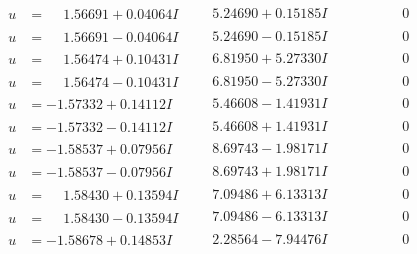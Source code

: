 \documentclass[1p]{elsarticle_modified}
\theoremstyle{definition}
\begin{document}
$$\begin{array}{c|c|c}
\begin{aligned}
u &= \phantom{-}1.56691 + 0.04064 I\end{aligned}
 & \phantom{-}5.24690 + 0.15185 I & \phantom{-0.000000 } 0 \\ \hline\begin{aligned}
u &= \phantom{-}1.56691 - 0.04064 I\end{aligned}
 & \phantom{-}5.24690 - 0.15185 I & \phantom{-0.000000 } 0 \\ \hline\begin{aligned}
u &= \phantom{-}1.56474 + 0.10431 I\end{aligned}
 & \phantom{-}6.81950 + 5.27330 I & \phantom{-0.000000 } 0 \\ \hline\begin{aligned}
u &= \phantom{-}1.56474 - 0.10431 I\end{aligned}
 & \phantom{-}6.81950 - 5.27330 I & \phantom{-0.000000 } 0 \\ \hline\begin{aligned}
u &= -1.57332 + 0.14112 I\end{aligned}
 & \phantom{-}5.46608 - 1.41931 I & \phantom{-0.000000 } 0 \\ \hline\begin{aligned}
u &= -1.57332 - 0.14112 I\end{aligned}
 & \phantom{-}5.46608 + 1.41931 I & \phantom{-0.000000 } 0 \\ \hline\begin{aligned}
u &= -1.58537 + 0.07956 I\end{aligned}
 & \phantom{-}8.69743 - 1.98171 I & \phantom{-0.000000 } 0 \\ \hline\begin{aligned}
u &= -1.58537 - 0.07956 I\end{aligned}
 & \phantom{-}8.69743 + 1.98171 I & \phantom{-0.000000 } 0 \\ \hline\begin{aligned}
u &= \phantom{-}1.58430 + 0.13594 I\end{aligned}
 & \phantom{-}7.09486 + 6.13313 I & \phantom{-0.000000 } 0 \\ \hline\begin{aligned}
u &= \phantom{-}1.58430 - 0.13594 I\end{aligned}
 & \phantom{-}7.09486 - 6.13313 I & \phantom{-0.000000 } 0 \\ \hline\begin{aligned}
u &= -1.58678 + 0.14853 I\end{aligned}
 & \phantom{-}2.28564 - 7.94476 I & \phantom{-0.000000 } 0 \\ \hline\begin{aligned}

\end{aligned}
\end{array}$$
\end{document}
